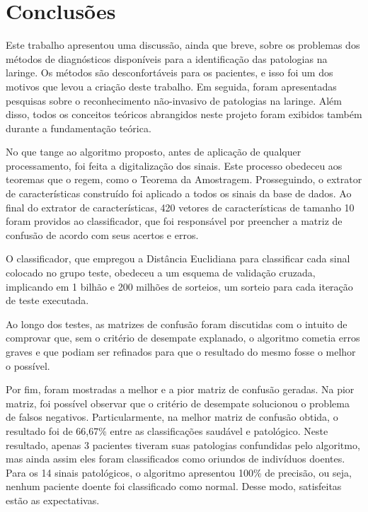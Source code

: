 \documentclass[a4paper,12pt,oneside]{report}
\begin{document}
\chapter{Conclus\~{o}es}
\hspace*{15pt} Este trabalho apresentou uma discuss\~{a}o, ainda que breve, sobre os problemas dos m\'{e}todos de diagn\'{o}sticos dispon\'{i}veis para a identifica\c{c}\~{a}o das patologias na laringe. Os m\'{e}todos s\~{a}o desconfort\'{a}veis para os pacientes, e isso foi um dos motivos que levou a cria\c{c}\~{a}o deste trabalho. Em seguida, foram apresentadas pesquisas sobre o reconhecimento n\~{a}o-invasivo de patologias na laringe. Al\'{e}m disso, todos os conceitos te\'{o}ricos abrangidos neste projeto foram exibidos tamb\'{e}m durante a fundamenta\c{c}\~{a}o te\'{o}rica.  
\\
\par No que tange ao algoritmo proposto, antes de aplica\c{c}\~{a}o de qualquer processamento, foi feita a digitaliza\c{c}\~{a}o dos sinais. Este processo obedeceu aos teoremas que o regem, como o Teorema da Amostragem. Prosseguindo,  o extrator de caracter\'{i}sticas constru\'{i}do foi aplicado a todos os sinais da base de dados. Ao final do extrator de caracter\'{i}sticas, 420 vetores de caracter\'{i}sticas de tamanho 10 foram providos ao classificador, que foi respons\'{a}vel por preencher a matriz de confus\~{a}o de acordo com seus acertos e erros. 
\\
\par O classificador, que empregou a Dist\^{a}ncia Euclidiana para classificar cada sinal colocado no grupo teste, obedeceu a um esquema de valida\c{c}\~{a}o cruzada, implicando em 1 bilh\~{a}o e 200 milh\~{o}es de sorteios, um sorteio para cada itera\c{c}\~{a}o de teste executada. 
\\ 
\par Ao longo dos testes, as matrizes de confus\~{a}o foram discutidas com o intuito de comprovar que, sem o crit\'{e}rio de desempate explanado, o 	algoritmo cometia erros graves e que podiam ser refinados para que o resultado do mesmo fosse o melhor o poss\'{i}vel. 
\\
\par Por fim, foram mostradas a melhor e a pior matriz de confus\~{a}o geradas. Na pior matriz, foi poss\'{i}vel observar que o crit\'{e}rio de desempate solucionou o problema de falsos negativos. Particularmente, na melhor matriz de confus\~{a}o obtida, o resultado foi de 66,67\% entre as clas\-si\-fi\-ca\-\c{c}\~{o}es saud\'{a}vel e patol\'{o}gico. Neste resultado, apenas 3 pacientes tiveram suas patologias confundidas pelo algoritmo, mas ainda assim eles foram classificados como oriundos de indiv\'{i}duos doentes. Para os 14 sinais patol\'{o}gicos, o 	algoritmo apresentou 100\% de precis\~{a}o, ou seja, nenhum paciente doente foi classificado como normal. Desse modo, satisfeitas est\~{a}o as expectativas.
\end{document}
